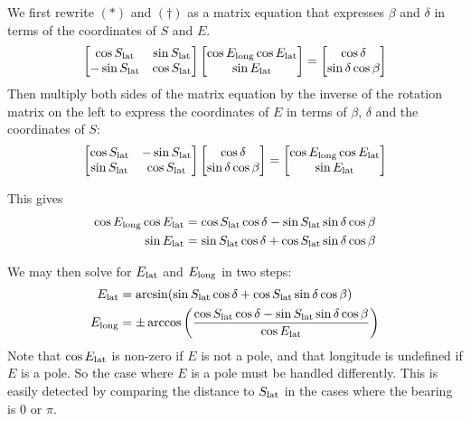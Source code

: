 \documentclass[12pt]{article}
\newcommand\lat[1]{{#1}_{\rm lat}}
\renewcommand\long[1]{{#1}_{\rm long}}
\begin{document}
We first rewrite $(\ast)$ and $(\dagger)$ as a matrix equation that expresses
$\beta$ and $\delta$ in terms of the coordinates of $S$ and $E$.
$$
  \left[
  \begin{matrix}
   \cos\lat S  & \sin\lat S \\
   -\sin\lat S & \cos\lat S
  \end{matrix}
  \right]
  \left[
   \begin{matrix}
    \cos\long E\cos\lat E \\
    \sin\lat E
   \end{matrix}
  \right]
  = \left[
    \begin{matrix}
    \cos\delta \\
    \sin\delta\cos\beta \\
    \end{matrix}
  \right]
$$
Then multiply both sides of the matrix equation by the inverse of the rotation
matrix on the left to express the coordinates of $E$ in terms of $\beta$,
$\delta$ and the coordinates of $S$:
$$
  \left[
  \begin{matrix}
   \cos\lat S  & -\sin\lat S \\
   \sin\lat S & \cos\lat S
  \end{matrix}
  \right]
  \left[
   \begin{matrix}
    \cos\delta\\
    \sin\delta\cos\beta
   \end{matrix}
  \right]
  = \left[
    \begin{matrix}
    \cos\long E\cos\lat E \\
    \sin\lat E \\
    \end{matrix}
  \right]
$$

This gives
\begin{align*}
  \cos\long E\cos\lat E &= \cos\lat S\cos\delta -
                          \sin\lat S\sin\delta\cos\beta\\
  \sin\lat E &= \sin\lat S\cos\delta + \cos\lat S\sin\delta\cos\beta
\end{align*}

We may then solve for $\lat E$ and $\long E$ in two steps:
\begin{align*}
  \lat E &= \arcsin(\sin\lat S\cos\delta + \cos\lat S\sin\delta\cos\beta)\\
  \long E &=\pm\arccos
            \left(
            \frac{\cos\lat S\cos\delta-\sin\lat S\sin\delta\cos\beta}{\cos\lat E}
            \right)
\end{align*}
Note that $\cos\lat E$ is non-zero if $E$ is not a pole, and that
longitude is undefined if $E$ is a pole.  So the case where $E$ is a pole
must be handled differently.  This is easily detected by comparing the
distance to $\lat S$ in the cases where the bearing is $0$ or $\pi$.
\end{document}
